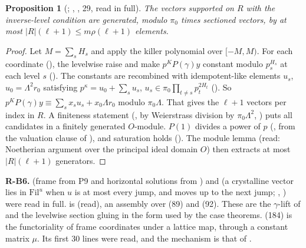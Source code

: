 \documentclass[11pt]{article}
\newcommand{\Fil}{\mathrm{Fil}}
\newtheorem{prop}[lemma]{Proposition}
\theoremstyle{definition}
\theoremstyle{remark}
\begin{document}
\begin{prop}[; , , 29, read in full]
The vectors supported on $R$ with the inverse-level condition are generated, modulo $\pi_0$ times sectioned vectors, by at most $|R|(\ell+1)\le m\rho(\ell+1)$ elements.
\end{prop}
\begin{proof}
Let $M=\sum_sH_s$ and apply the killer polynomial over $[-M,M)$. For each coordinate (), the levelwise raise and  make $p^K P(\gamma)y$ constant modulo $p_s^{H_s}$ at each level $s$ (). The constants are recombined with idempotent-like elements $u_s$, $u_0=\Lambda^2r_0$ satisfying $p^{\kappa}=u_0+\sum_su_s$, $u_s\in\pi_0\prod_{t\ne s}p_t^{2H_t}$ (). So $p^KP(\gamma)y\equiv\sum_sx_su_s+x_0\Lambda r_0$ modulo $\pi_0\Lambda$. That gives the $\ell+1$ vectors per index in $R$. A finiteness statement (, by Weierstrass division by $\pi_0\Lambda^2$, ) puts all candidates in a finitely generated $O$-module. $P(1)$ divides a power of $p$ (, from the valuation clause of ), and saturation holds (). The module lemma  (read: Noetherian argument over the principal ideal domain $O$) then extracts at most $|R|(\ell+1)$ generators.
\end{proof}

\noindent\textbf{R-B6.}  (frame from P9 and horizontal solutions from ) and  (a crystalline vector lies in $\Fil^u$ when $u$ is at most every jump, and moves up to the next jump; , ) were read in full.  is  (read), an assembly over  (89) and  (92). These are the $\gamma$-lift of  and the levelwise section gluing in the form used by the case theorems.  (184) is the functoriality of frame coordinates under a lattice map, through a constant matrix $\mu$. Its first 30 lines were read, and the mechanism is that of .
\end{document}
